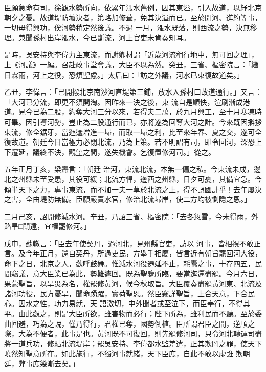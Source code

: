 \begin{pinyinscope}
 臣願急命有司，徐觀水勢所向，依累年漲水舊例，因其東溢，引入故道，以紓北京朝夕之憂。故道堤防壞決者，第略加修葺，免其決溢而已。至於開河、進約等事，一切毋得興功，俟河勢稍定然後議。不過
 一月，漲水既落，則西流之勢，決無移理。兼聞孫村出岸漲水，今已斷流，河上官吏未肯奏知耳。



 是時，吳安持與李偉力主東流，而謝卿材謂「近歲河流稍行地中，無可回之理」，上《河議》一編。召赴政事堂會議，大臣不以為然。癸丑，三省、樞密院言：「繼日霖雨，河上之役，恐煩聖慮。」太后曰：「訪之外議，河水已東復故道矣。」



 乙丑，李偉言：「已開撥北京南沙河直堤第三鋪，放水入孫村口故道通行。」又言：「大河已分流，即更不須開淘。因昨來一決之後，東
 流自是順快，渲刷漸成港道。見今已為二股，約奪大河三分以來，若得夫二萬，於九月興工，至十月寒凍時可畢。因引導河勢，豈止為二股通行而已，亦將遂為回奪大河之計。今來既因擗拶東流，修全鋸牙，當迤邐增進一埽，而取一埽之利，比至來年春、夏之交，遂可全復故道。朝廷今日當極力必閉北流，乃為上策。若不明詔有司，即令回河，深恐上下遷延，議終不決，觀望之間，遂失機會。乞復置修河司。」從之。



 五年正月丁亥，梁燾言：「朝廷
 治河，東流北流，本無一偏之私。今東流未成，邊北之州縣未至受患，其役可緩；北流方悍，邊西之州縣，日夕可憂，其備宜急。今傾半天下之力，專事東流，而不加一夫一草於北流之上，得不誤國計乎！去年屢決之害，全由堤防無備。臣願嚴責水官，修治北流埽岸，使二方均被惻隱之恩。」



 二月己亥，詔開修減水河。辛丑，乃詔三省、樞密院：「去冬愆雪，今未得雨，外路旱□闊遠，宜權罷修河。」



 戊申，蘇轍言：「臣去年使契丹，過河北，見州縣官吏，訪以
 河事，皆相視不敢正言。及今年正月，還自契丹，所過吏民，方舉手相慶，皆言近有朝旨罷回河大役，命下之日，北京之人，歡呼鼓舞。惟減水河役遷延不止，耗蠹之事，十存四五，民間竊議，意大臣業已為此，勢難遽回。既為聖鑒所臨，要當迤邐盡罷。今月六日，果蒙聖旨，以旱災為名，權罷修黃河，候今秋取旨。大臣覆奏盡罷黃河東、北流及諸河功役，民方憂旱，聞命踴躍，實荷聖恩。然臣竊詳聖旨，上合天意，下合民心。因水之性，功力易就，天
 語激切，中外聞者或至泣下，而臣奉行，不得其平。由此觀之，則是大臣所欲，雖害物而必行；陛下所為，雖利民而不聽。至於委曲回避，巧為之說，僅乃得行，君權已奪，國勢倒植。臣所謂君臣之間，逆順之際，大為不便者，此事是也。黃河既不可復回，則先罷修河司，只令河北轉運司盡將一道兵功，修貼北流堤岸；罷吳安持、李偉都水監差遣，正其欺罔之罪，使天下曉然知聖意所在。如此施行，不獨河事就緒，天下臣庶，自此不敢以虛誑
 欺朝廷，弊事庶幾漸去矣。」




\end{pinyinscope}
